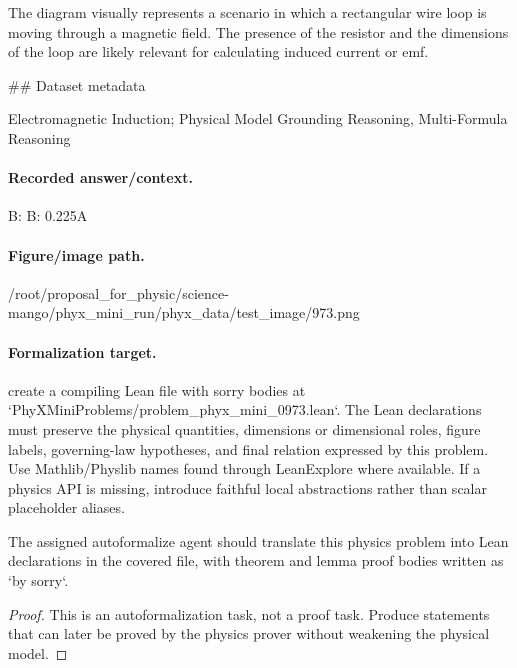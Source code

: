 The diagram visually represents a scenario in which a rectangular wire loop is moving through a magnetic field. The presence of the resistor and the dimensions of the loop are likely relevant for calculating induced current or emf.

\#\# Dataset metadata

Electromagnetic Induction; Physical Model Grounding Reasoning, Multi-Formula Reasoning

\paragraph{Recorded answer/context.}
B: B: 0.225A

\paragraph{Figure/image path.}
/root/proposal\_for\_physic/science-mango/phyx\_mini\_run/phyx\_data/test\_image/973.png

\paragraph{Formalization target.}
create a compiling Lean file with sorry bodies at `PhyXMiniProblems/problem\_phyx\_mini\_0973.lean`. The Lean declarations must preserve the physical quantities, dimensions or dimensional roles, figure labels, governing-law hypotheses, and final relation expressed by this problem.
Use Mathlib/Physlib names found through LeanExplore where available. If a physics API is missing, introduce faithful local abstractions rather than scalar placeholder aliases.

\begin{theorem}
\label{thm:physics:phyx_mini_0973:target}
The assigned autoformalize agent should translate this physics problem into Lean declarations in the covered file, with theorem and lemma proof bodies written as `by sorry`.
\end{theorem}
\begin{proof}
This is an autoformalization task, not a proof task. Produce statements that can later be proved by the physics prover without weakening the physical model.
\end{proof}

